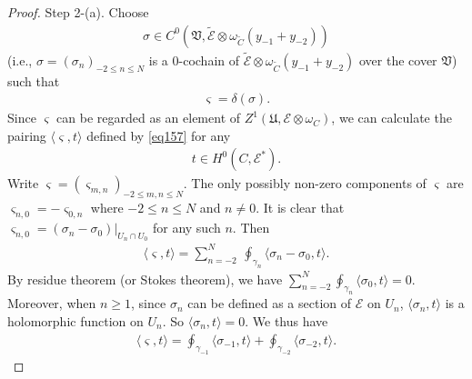 \documentclass[12pt,a4paper,notitlepage]{report}
\theoremstyle{definition}
\theoremstyle{plain}
\newcommand{\fk}{\mathfrak}
\newcommand{\wtd}{\widetilde}
\newcommand{\bk}[1]{\langle {#1}\rangle}
\newcommand{\scr}{\mathscr}
\newcommand{\sgm}{\varsigma}
\numberwithin{equation}{section}
\begin{document}
\begin{proof}
Step 2-(a). Choose 
\begin{align*}
\sigma\in C^0(\fk V,\wtd{\scr E}\otimes \omega_{\wtd C}(y_{-1}+y_{-2}))
\end{align*}
(i.e., $\sigma=(\sigma_n)_{-2\leq n\leq N}$ is a $0$-cochain of $\wtd{\scr E}\otimes \omega_{\wtd C}(y_{-1}+y_{-2})$ over the cover $\fk V$) such that
\begin{align*}
\sgm=\delta(\sigma).
\end{align*}
Since $\sgm$ can be regarded as an element of $Z^1(\fk U,\scr E\otimes\omega_C)$, we can  calculate the pairing $\bk{\sgm,t}$ defined by \eqref{eq157} for any
\begin{align*}
t\in H^0(C,\scr E^*).
\end{align*}
Write $\sgm=(\sgm_{m,n})_{-2\leq m,n\leq N}$. The only possibly non-zero components of $\sgm$ are $\sgm_{n,0}=-\sgm_{0,n}$ where $-2\leq n\leq N$ and $n\neq 0$. It is clear that $\sgm_{n,0}=(\sigma_n-\sigma_0)|_{U_n\cap U_0}$ for any such $n$. Then
\begin{align*}
\bk{\sgm,t}=\sum_{n=-2}^N~\oint_{\gamma_n}\bk{\sigma_n-\sigma_0,t}.
\end{align*}
By residue theorem (or Stokes theorem), we have $\sum_{n=-2}^{N}\oint_{\gamma_n}\bk{\sigma_0,t}=0$. Moreover, when $n\geq 1$, since $\sigma_n$ can be defined as a section of $\scr E$ on $U_n$, $\bk{\sigma_n,t}$ is a holomorphic function on $U_n$. So $\bk{\sigma_n,t}=0$. We thus have
\begin{align*}
\bk{\sgm,t}=\oint_{\gamma_{-1}}\bk{\sigma_{-1},t}+\oint_{\gamma_{-2}}\bk{\sigma_{-2},t}.
\end{align*}


\end{proof}
\end{document}
